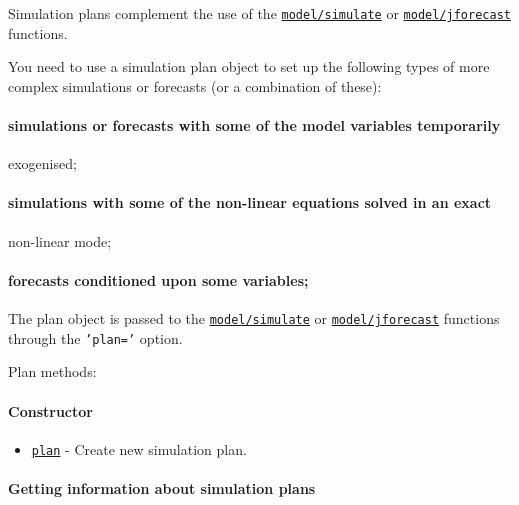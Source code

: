 

	Simulation plans complement the use of the
\href{model/simulate}{\texttt{model/simulate}} or
\href{model/jforecast}{\texttt{model/jforecast}} functions.

You need to use a simulation plan object to set up the following types
of more complex simulations or forecasts (or a combination of these):

\paragraph{simulations or forecasts with some of the model variables
temporarily}\label{simulations-or-forecasts-with-some-of-the-model-variables-temporarily}

exogenised;

\paragraph{simulations with some of the non-linear equations solved in
an
exact}\label{simulations-with-some-of-the-non-linear-equations-solved-in-an-exact}

non-linear mode;

\paragraph{forecasts conditioned upon some
variables;}\label{forecasts-conditioned-upon-some-variables}

The plan object is passed to the
\href{model/simulate}{\texttt{model/simulate}} or
\href{model/jforecast}{\texttt{model/jforecast}} functions through the
\texttt{'plan='} option.

Plan methods:

\paragraph{Constructor}\label{constructor}

\begin{itemize}
\itemsep1pt\parskip0pt
\item
  \href{plan/plan}{\texttt{plan}} - Create new simulation plan.
\end{itemize}

\paragraph{Getting information about simulation
plans}\label{getting-information-about-simulation-plans}

